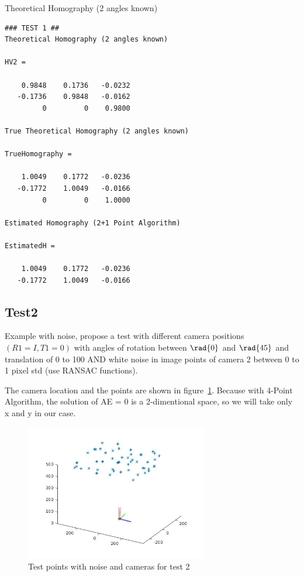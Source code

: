 \documentclass[a4paper,12pt]{article}
\begin{document}
Theoretical Homography (2 angles known)

\begin{verbatim}
### TEST 1 ##
Theoretical Homography (2 angles known)

HV2 =

    0.9848    0.1736   -0.0232
   -0.1736    0.9848   -0.0162
         0         0    0.9800

True Theoretical Homography (2 angles known)

TrueHomography =

    1.0049    0.1772   -0.0236
   -0.1772    1.0049   -0.0166
         0         0    1.0000

Estimated Homography (2+1 Point Algorithm)

EstimatedH =

    1.0049    0.1772   -0.0236
   -0.1772    1.0049   -0.0166
\end{verbatim}

\subsection{Test2}
Example with noise, propose a test with different camera positions $(R1 =
I, T1 = 0)$ with angles of rotation between $\rad{0}$ and $\rad{45}$ and translation of 0 to
100 AND white noise in image points of camera 2 between 0 to 1 pixel std (use
RANSAC functions).

The camera location and the points are shown in figure~\ref{fig:points2}. Because with 4-Point Algorithm, the solution of AE = 0 is a
 2-dimentional space, so we will take only x and y in our  case.

\begin{figure}[tb]
         \centering
         \includegraphics[width=8cm]{Images/points3D-test2.jpg}
         \caption{Test points with noise  and cameras for test 2}
 	\label{fig:points2}
\end{figure}
\end{document}
